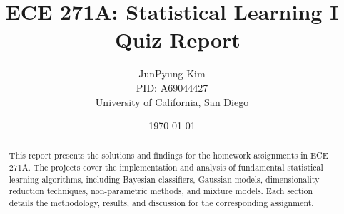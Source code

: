 \documentclass[11pt, letterpaper]{article}
\title{ECE 271A: Statistical Learning I \ Quiz Report}
\author{
JunPyung Kim \\
PID: A69044427 \\
University of California, San Diego
}
\date{\today}
\begin{document}
\maketitle

\ifdefined\compileall
\begin{abstract}
This report presents the solutions and findings for the homework assignments in ECE 271A. The projects cover the implementation and analysis of fundamental statistical learning algorithms, including Bayesian classifiers, Gaussian models, dimensionality reduction techniques, non-parametric methods, and mixture models. Each section details the methodology, results, and discussion for the corresponding assignment.
\end{abstract}
\tableofcontents
\newpage
\fi


\ifdefined\compileall

% 
% 
% 
\fi

\ifdefined\singlehw

\fi
\end{document}
